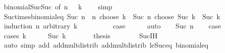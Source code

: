 \begin{isabellebody}
%
\isatagproof
{}\isamarkupfalse%
\ binomial{\isacharunderscore}{\kern0pt}Suc{\isacharunderscore}{\kern0pt}Suc\ {\isacharbrackleft}{\kern0pt}of\ {\isachardoublequoteopen}n\ {\isacharminus}{\kern0pt}\ {}{\isachardoublequoteclose}\ {\isachardoublequoteopen}k\ {\isacharminus}{\kern0pt}\ {}{\isachardoublequoteclose}{\isacharbrackright}{\kern0pt}\ \isamarkupfalse%
\ simp%
\endisatagproof
{\isafoldproof}%
%
\isadelimproof
\isanewline
%
\endisadelimproof
\isanewline
{}\isamarkupfalse%
\ Suc{\isacharunderscore}{\kern0pt}times{\isacharunderscore}{\kern0pt}binomial{\isacharunderscore}{\kern0pt}eq{\isacharcolon}{\kern0pt}\ {\isachardoublequoteopen}Suc\ n\ {\isacharasterisk}{\kern0pt}\ {\isacharparenleft}{\kern0pt}n\ choose\ k{\isacharparenright}{\kern0pt}\ {\isacharequal}{\kern0pt}\ {\isacharparenleft}{\kern0pt}Suc\ n\ choose\ Suc\ k{\isacharparenright}{\kern0pt}\ {\isacharasterisk}{\kern0pt}\ Suc\ k{\isachardoublequoteclose}\isanewline
%
\isadelimproof
%
\endisadelimproof
%
\isatagproof
{}\isamarkupfalse%
\ {\isacharparenleft}{\kern0pt}induction\ n\ arbitrary{\isacharcolon}{\kern0pt}\ k{\isacharparenright}{\kern0pt}\isanewline
\ \ \isamarkupfalse%
\ {}\isanewline
\ \ \isamarkupfalse%
\ \isamarkupfalse%
\ {\isacharquery}{\kern0pt}case\isanewline
\ \ \ \ \isamarkupfalse%
\ auto\isanewline
{}\isamarkupfalse%
\isanewline
\ \ \isamarkupfalse%
\ {\isacharparenleft}{\kern0pt}Suc\ n{\isacharparenright}{\kern0pt}\isanewline
\ \ \isamarkupfalse%
\ {\isacharquery}{\kern0pt}case\ \isanewline
\ \ \isamarkupfalse%
\ {\isacharparenleft}{\kern0pt}cases\ k{\isacharparenright}{\kern0pt}\isanewline
\ \ \ \ \isamarkupfalse%
\ {\isacharparenleft}{\kern0pt}Suc\ k{\isacharprime}{\kern0pt}{\isacharparenright}{\kern0pt}\isanewline
\ \ \ \ \isamarkupfalse%
\ \isamarkupfalse%
\ {\isacharquery}{\kern0pt}thesis\isanewline
\ \ \ \ \ \ \isamarkupfalse%
\ Suc{\isachardot}{\kern0pt}IH\isanewline
\ \ \ \ \ \ \isamarkupfalse%
\ {\isacharparenleft}{\kern0pt}auto\ simp\ add{\isacharcolon}{\kern0pt}\ add{\isacharunderscore}{\kern0pt}mult{\isacharunderscore}{\kern0pt}distrib\ add{\isacharunderscore}{\kern0pt}mult{\isacharunderscore}{\kern0pt}distrib{}\ le{\isacharunderscore}{\kern0pt}Suc{\isacharunderscore}{\kern0pt}eq\ binomial{\isacharunderscore}{\kern0pt}eq{\isacharunderscore}{\kern0pt}{}{\isacharparenright}{\kern0pt}\isanewline

\end{isabellebody}
